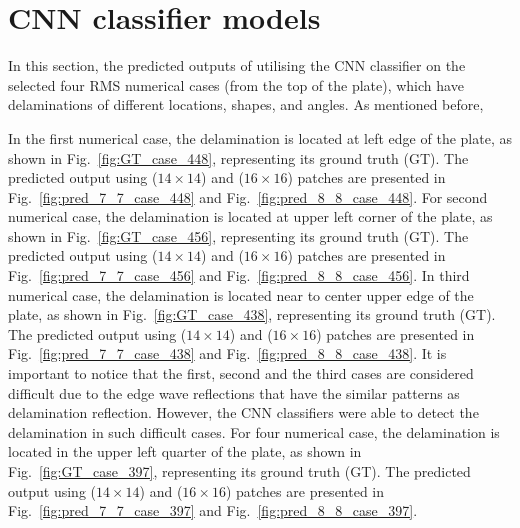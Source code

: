 \section{CNN classifier models}
\label{sec51}

In this section, the predicted outputs of utilising the CNN classifier on the selected four RMS numerical cases (from the top of the plate), which have delaminations of different locations, shapes, and angles.
As mentioned before, 

In the first numerical case, the delamination is located at left edge of the plate, as shown in Fig.~\ref{fig:GT_case_448}, representing its ground truth (GT).
The predicted output using (\(14\times14\)) and (\(16\times16\)) patches are presented in Fig.~\ref{fig:pred_7_7_case_448} and Fig.~\ref{fig:pred_8_8_case_448}.
For second numerical case, the delamination is located at upper left corner of the plate, as shown in Fig.~\ref{fig:GT_case_456}, representing its ground truth (GT).
The predicted output using (\(14\times14\)) and (\(16\times16\)) patches are presented in Fig.~\ref{fig:pred_7_7_case_456} and Fig.~\ref{fig:pred_8_8_case_456}.
In third numerical case, the delamination is located near to center upper edge of the plate, as shown in Fig.~\ref{fig:GT_case_438}, representing its ground truth (GT).
The predicted output using (\(14\times14\)) and (\(16\times16\)) patches are presented in Fig.~\ref{fig:pred_7_7_case_438} and Fig.~\ref{fig:pred_8_8_case_438}.
It is important to notice that the first, second and the third cases are considered difficult due to the edge wave reflections that have the similar patterns as delamination reflection.
However, the CNN classifiers were able to detect the delamination in such difficult cases.
For four numerical case, the delamination is located in the upper left quarter of the plate, as shown in Fig.~\ref{fig:GT_case_397}, representing its ground truth (GT).
The predicted output using (\(14\times14\)) and (\(16\times16\)) patches are presented in Fig.~\ref{fig:pred_7_7_case_397} and Fig.~\ref{fig:pred_8_8_case_397}.

